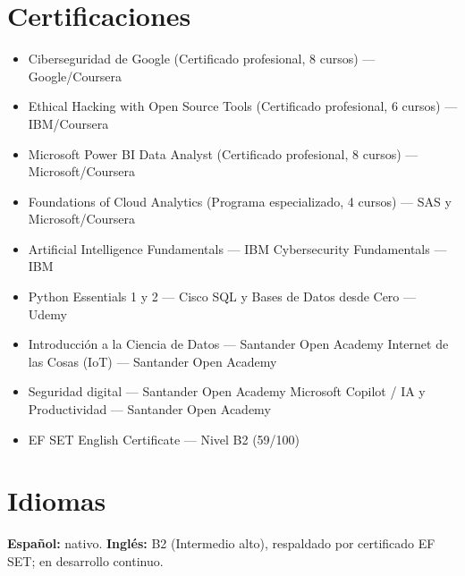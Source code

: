 \documentclass[11pt,a4paper]{article}
\begin{document}
\section{Certificaciones}
\begin{itemize}[itemsep=1pt]
  \item Ciberseguridad de Google (Certificado profesional, 8 cursos) --- Google/Coursera
  \item Ethical Hacking with Open Source Tools (Certificado profesional, 6 cursos) --- IBM/Coursera
  \item Microsoft Power BI Data Analyst (Certificado profesional, 8 cursos) --- Microsoft/Coursera
  \item Foundations of Cloud Analytics (Programa especializado, 4 cursos) --- SAS y Microsoft/Coursera
  \item Artificial Intelligence Fundamentals --- IBM \hfill\textbullet\hfill Cybersecurity Fundamentals --- IBM
  \item Python Essentials 1 y 2 --- Cisco \hfill\textbullet\hfill SQL y Bases de Datos desde Cero --- Udemy
  \item Introducción a la Ciencia de Datos --- Santander Open Academy \hfill\textbullet\hfill Internet de las Cosas (IoT) --- Santander Open Academy
  \item Seguridad digital --- Santander Open Academy \hfill\textbullet\hfill Microsoft Copilot / IA y Productividad --- Santander Open Academy
  \item EF SET English Certificate --- Nivel B2 (59/100)
\end{itemize}

\section{Idiomas}
\textbf{Español:} nativo. \qquad \textbf{Inglés:} B2 (Intermedio alto), respaldado por certificado EF SET; en desarrollo continuo.
\end{document}
